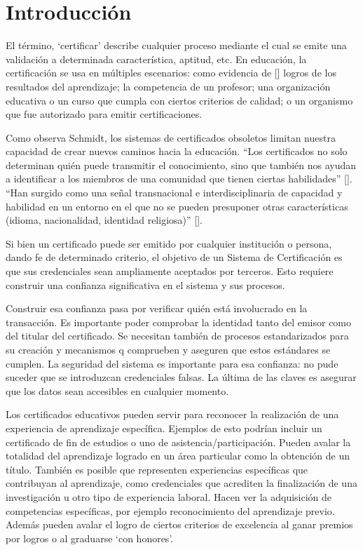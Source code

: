 \chapter*{Introducción}\label{chapter:introduction}

El término, `certificar' describe cualquier proceso mediante el cual se emite una validación a determinada característica, aptitud, etc. En educación, la certificación se usa en múltiples escenarios: como evidencia de [\cite{grech2017blockchain}] logros de los resultados del aprendizaje; la competencia de un profesor; una organización educativa o un curso que cumpla con ciertos criterios de calidad; o un organismo que fue autorizado para emitir certificaciones.

Como observa Schmidt, los sistemas de certificados obsoletos limitan nuestra capacidad de crear nuevos caminos hacia la educación.
``Los certificados no solo determinan quién puede transmitir el conocimiento, sino que también nos ayudan a identificar a los miembros de una comunidad que tienen ciertas habilidades'' [\cite{schmidt2015certificates}].
``Han surgido como una señal transnacional e interdisciplinaria de capacidad y habilidad en un entorno en el que no se pueden presuponer otras características (idioma, nacionalidad, identidad religiosa)'' [\cite{smolenski2017blockchain}]. 

Si bien un certificado puede ser emitido por cualquier institución o persona, dando fe de determinado criterio, el objetivo de un Sistema de Certificación es que sus credenciales sean ampliamente aceptados por terceros. Esto requiere construir una confianza significativa en el sistema y sus procesos. 

Construir esa confianza pasa por verificar quién está involucrado en la transacción. Es importante poder comprobar la identidad tanto del emisor como del titular del certificado. Se necesitan también de procesos estandarizados para su creación y mecanismos q comprueben y aseguren que estos estándares se cumplen. La seguridad del sistema es importante para esa confianza: no pude suceder que se introduzcan credenciales falsas. La última de las claves es asegurar que los datos sean accesibles en cualquier momento.

Los certificados educativos pueden servir para reconocer la realización de una experiencia de aprendizaje específica. Ejemplos de esto podrían incluir un	certificado de fin de estudios o uno de asistencia/participación. Pueden avalar la totalidad del aprendizaje logrado en un área particular como la obtención de un título. También es posible que representen experiencias específicas que contribuyan al aprendizaje, como credenciales que acrediten la finalización de una investigación u otro tipo de experiencia laboral. Hacen ver la adquisición de competencias específicas, por ejemplo reconocimiento del aprendizaje previo. Además pueden avalar el logro de ciertos criterios de excelencia  al ganar premios por logros o al graduarse `con honores'.

